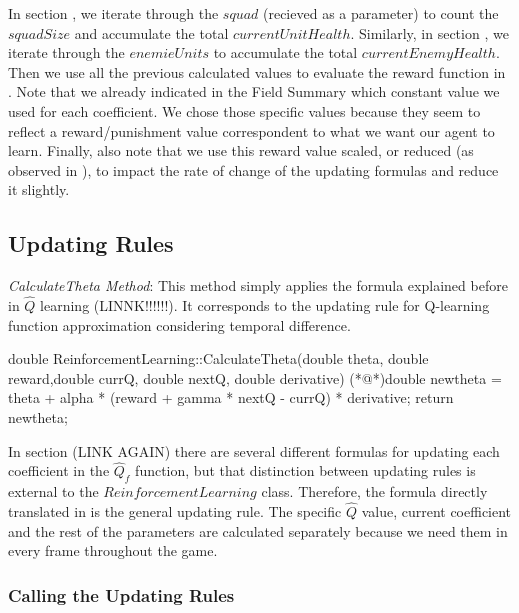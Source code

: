 In section , we iterate through the $squad$ (recieved as a parameter) to count the $squadSize$ and accumulate the total $currentUnitHealth$. Similarly, in section , we iterate through the $enemieUnits$ to accumulate the total $currentEnemyHealth$.\\

Then we use all the previous calculated values to evaluate the reward function in . Note that we already indicated in the Field Summary which constant value we used for each coefficient. We chose those specific values because they seem to reflect a reward/punishment value correspondent to what we want our agent to learn. Finally, also note that we use this reward value scaled, or reduced (as observed in ), to impact the rate of change of the updating formulas and reduce it slightly. \\

\subsection{Updating Rules}

\textit{CalculateTheta Method}: This method simply applies the formula explained before in $\hat{Q}$ learning (LINNK!!!!!!). It corresponds to the updating rule for Q-learning function approximation considering temporal difference.\\

\begin{Sourcecode}[caption=CalculateTheta Method]
double ReinforcementLearning::CalculateTheta(double theta, double reward,double currQ, double nextQ, double derivative)
{
	(*@\lnote@*)double newtheta = theta + alpha * (reward + gamma * nextQ - currQ) * derivative;
	return newtheta;
}
\end{Sourcecode}

In section (LINK AGAIN) there are several different formulas for updating each coefficient in the $\hat{Q}_f$ function, but that distinction between updating rules is external to the $ReinforcementLearning$ class. Therefore, the formula directly translated in  is the general updating rule. The specific $\hat{Q}$ value, current coefficient and the rest of the parameters are calculated separately because we need them in every frame throughout the game. \\

\subsubsection{Calling the Updating Rules}

